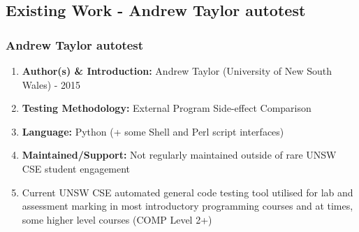 \documentclass[xcolor]{beamer}
\begin{document}
\subsection{Existing Work - Andrew Taylor autotest}
\begin{frame}
	\frametitle{Andrew Taylor autotest}
	\begin{enumerate}
		\setlength\itemsep{1em}
		\item \textbf{Author(s) \& Introduction:} Andrew Taylor (University of New South Wales) - 2015 
			\pause
		\item \textbf{Testing Methodology:} External Program Side-effect Comparison 
			\pause
		\item \textbf{Language:} Python (+ some Shell and Perl script interfaces) 
			\pause
		\item \textbf{Maintained/Support:} Not regularly maintained outside of rare UNSW CSE student engagement
			\pause 
		\item Current UNSW CSE automated general code testing tool utilised for lab and assessment marking in most introductory programming courses and at times, some higher level courses (COMP Level 2+) 
	\end{enumerate}
\end{frame}
\end{document}
